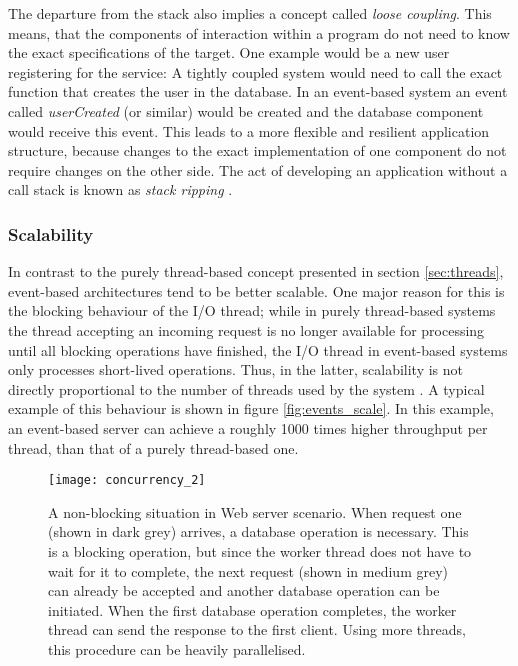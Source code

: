 The departure from the stack also implies a concept called \textit{loose coupling}. This means, that the components of interaction within a program do not need to know the exact specifications of the target. One example would be a new user registering for the service: A tightly coupled system would need to call the exact function that creates the user in the database. In an event-based system an event called \textit{userCreated} (or similar) would be created and the database component would receive this event. This leads to a more flexible and resilient application structure, because changes to the exact implementation of one component do not require changes on the other side. The act of developing an application without a call stack is known as \textit{stack ripping} \cite{Drolia2010}.

\subsubsection*{Scalability}
In contrast to the purely thread-based concept presented in section \ref{sec:threads}, event-based architectures tend to be better scalable. One major reason for this is the blocking behaviour of the I/O thread; while in purely thread-based systems the thread accepting an incoming request is no longer available for processing until all blocking operations have finished, the I/O thread in event-based systems only processes short-lived operations. Thus, in the latter, scalability is not directly proportional to the number of threads used by the system \cite[p. 2]{Carrera}. A typical example of this behaviour is shown in figure \ref{fig:events_scale}. In this example, an event-based server can achieve a roughly 1000 times higher throughput per thread, than that of a purely thread-based one.

\begin{figure}
\centering\small
\setlength{\tabcolsep}{0mm}
  \texttt{[image: concurrency\_2]}
\caption{
A non-blocking situation in Web server scenario. When request one (shown in dark grey) arrives, a database operation is necessary. This is a blocking operation, but since the worker thread does not have to wait for it to complete, the next request (shown in medium grey) can already be accepted and another database operation can be initiated. When the first database operation completes, the worker thread can send the response to the first client. Using more threads, this procedure can be heavily parallelised.
}
\label{fig:concurrency_2}
\end{figure}


